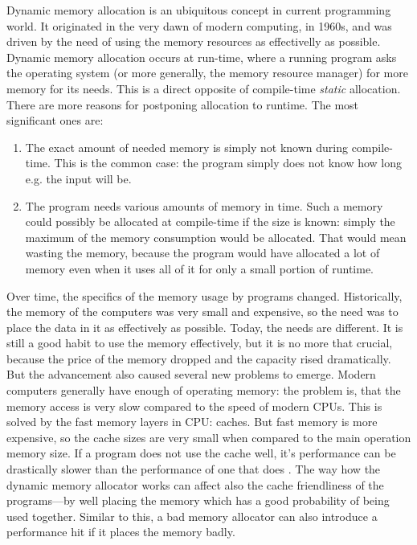 Dynamic memory allocation is an ubiquitous concept in current programming world. It originated in the very dawn of modern computing, in 1960s, and was driven by the need of using the memory resources as effectivelly as possible. Dynamic memory allocation occurs at run-time, where a running program asks the operating system (or more generally, the memory resource manager) for more memory for its needs. This is a direct opposite of compile-time {\em static} allocation. There are more reasons for postponing allocation to runtime. The most significant ones are:
\begin{enumerate}
\item The exact amount of needed memory is simply not known during compile-time. This is the common case: the program simply does not know how long e.g. the input will be.
\item The program needs various amounts of memory in time. Such a memory could possibly be allocated at compile-time if the size is known: simply the maximum of the memory consumption would be allocated. That would mean wasting the memory, because the program would have allocated a lot of memory even when it uses all of it for only a small portion of runtime.
\end{enumerate}

Over time, the specifics of the memory usage by programs changed. Historically, the memory of the computers was very small and expensive, so the need was to place the data in it as effectively as possible. Today, the needs are different. It is still a good habit to use the memory effectively, but it is no more that crucial, because the price of the memory dropped and the capacity rised dramatically. But the advancement also caused several new problems to emerge. Modern computers generally have enough of operating memory: the problem is, that the memory access is very slow compared to the speed of modern CPUs. This is solved by the fast memory layers in CPU: caches. But fast memory is more expensive, so the cache sizes are very small when compared to the main operation memory size. If a program does not use the cache well, it's performance can be drastically slower than the performance of one that does \cite{drepper-memory}. The way how the dynamic memory allocator works can affect also the cache friendliness of the programs---by well placing the memory which has a good probability of being used together. Similar to this, a bad memory allocator can also introduce a performance hit if it places the memory badly.       

